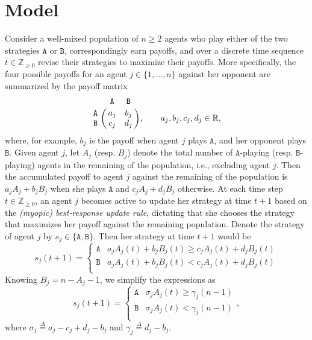 \documentclass[10 pt,twocolumn,journal]{IEEEtran}
\theoremstyle{plain}
\newcommand{\A}{\mathcal{A}}
\renewcommand{\A}{\mathtt{A}}
\newcommand{\B}{\mathtt{B}}
\theoremstyle{definition}
\begin{document}
\section{Model}
Consider a well-mixed population of $n\geq 2$ agents who play either of the two strategies $\A$ or $\B$, correspondingly earn payoffs, and over a discrete time sequence $t \in \mathbb{Z}_{\geq 0}$ revise their strategies to maximize their payoffs. 
More specifically, the four possible payoffs for an agent $j\in\{1,\ldots,n\}$ against her opponent are summarized by the payoff matrix 
\begin{equation*}
    \bordermatrix{
	& \A & \B \cr \A & a_j & b_j \cr \B & c_j & d_j
	},\qquad a_j,b_j,c_j,d_j \in \mathbb{R},
	\label{eq:payoffMatrix}
\end{equation*}
where, for example, $b_j$ is the payoff when agent $j$ plays $\A$, and her opponent plays $\B$.
Given agent $j$, let $A_{j}$ (resp. $B_j$) denote the total number of $\A$-playing (resp. $\B$-playing) agents in the remaining of the population, i.e., excluding agent $j$. 
Then the accumulated payoff to agent $j$ against the remaining of the population is $a_j A_j+b_j B_j$ when she plays $\A$ and $c_j A_j+d_j B_j$ otherwise. 
At each time step $t\in\mathbb{Z}_{\geq0}$, an agent $j$ becomes active to update her strategy at time $t+1$ based on the \emph{(myopic) best-response update rule}, dictating that she chooses the strategy that maximizes her payoff against the remaining population.
Denote the strategy of agent $j$ by $s_j\in\{\A,\B\}$. 
Then her strategy at time $t+1$ would be 
\begin{equation*}
	s_j(t+1)=\begin{cases}
	    \A &a_j A_j(t)+b_j B_j(t)\geq c_j A_j(t)+d_j B_j(t)\\
	    \B &a_j A_j(t)+b_j B_j(t) < c_j A_j(t)+d_j B_j(t)\\
	\end{cases}
\end{equation*}
Knowing $B_j = n-A_j-1$, we simplify the expressions as
\begin{equation}
	s_j(t+1)=
	\begin{cases}
	    \A &\sigma_j A_j(t)\geq \gamma_j (n-1)\\
	    \B &\sigma_j A_j(t)< \gamma_j (n-1)\\
	\end{cases},
	\label{eq:model}
\end{equation}
where $\sigma_j \overset{\Delta}{=} a_j-c_j+d_j-b_j$ and $\gamma_j \overset{\Delta}{=} d_j-b_j$.
\end{document}
